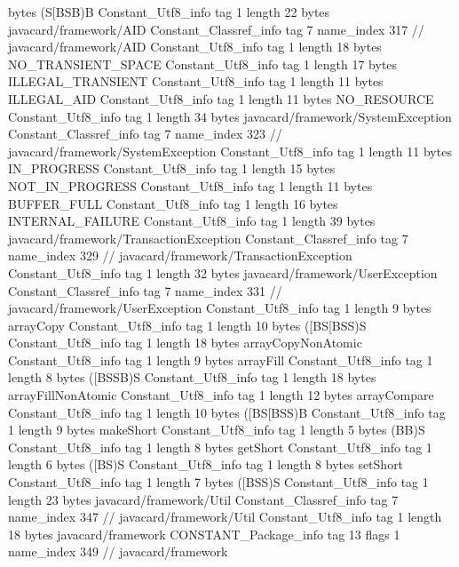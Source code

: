 {{{			bytes	(S[BSB)B
		}
		Constant_Utf8_info {
			tag	1
			length	22
			bytes	javacard/framework/AID
		}
		Constant_Classref_info {
			tag	7
			name_index	317		// javacard/framework/AID
		}
		Constant_Utf8_info {
			tag	1
			length	18
			bytes	NO_TRANSIENT_SPACE
		}
		Constant_Utf8_info {
			tag	1
			length	17
			bytes	ILLEGAL_TRANSIENT
		}
		Constant_Utf8_info {
			tag	1
			length	11
			bytes	ILLEGAL_AID
		}
		Constant_Utf8_info {
			tag	1
			length	11
			bytes	NO_RESOURCE
		}
		Constant_Utf8_info {
			tag	1
			length	34
			bytes	javacard/framework/SystemException
		}
		Constant_Classref_info {
			tag	7
			name_index	323		// javacard/framework/SystemException
		}
		Constant_Utf8_info {
			tag	1
			length	11
			bytes	IN_PROGRESS
		}
		Constant_Utf8_info {
			tag	1
			length	15
			bytes	NOT_IN_PROGRESS
		}
		Constant_Utf8_info {
			tag	1
			length	11
			bytes	BUFFER_FULL
		}
		Constant_Utf8_info {
			tag	1
			length	16
			bytes	INTERNAL_FAILURE
		}
		Constant_Utf8_info {
			tag	1
			length	39
			bytes	javacard/framework/TransactionException
		}
		Constant_Classref_info {
			tag	7
			name_index	329		// javacard/framework/TransactionException
		}
		Constant_Utf8_info {
			tag	1
			length	32
			bytes	javacard/framework/UserException
		}
		Constant_Classref_info {
			tag	7
			name_index	331		// javacard/framework/UserException
		}
		Constant_Utf8_info {
			tag	1
			length	9
			bytes	arrayCopy
		}
		Constant_Utf8_info {
			tag	1
			length	10
			bytes	([BS[BSS)S
		}
		Constant_Utf8_info {
			tag	1
			length	18
			bytes	arrayCopyNonAtomic
		}
		Constant_Utf8_info {
			tag	1
			length	9
			bytes	arrayFill
		}
		Constant_Utf8_info {
			tag	1
			length	8
			bytes	([BSSB)S
		}
		Constant_Utf8_info {
			tag	1
			length	18
			bytes	arrayFillNonAtomic
		}
		Constant_Utf8_info {
			tag	1
			length	12
			bytes	arrayCompare
		}
		Constant_Utf8_info {
			tag	1
			length	10
			bytes	([BS[BSS)B
		}
		Constant_Utf8_info {
			tag	1
			length	9
			bytes	makeShort
		}
		Constant_Utf8_info {
			tag	1
			length	5
			bytes	(BB)S
		}
		Constant_Utf8_info {
			tag	1
			length	8
			bytes	getShort
		}
		Constant_Utf8_info {
			tag	1
			length	6
			bytes	([BS)S
		}
		Constant_Utf8_info {
			tag	1
			length	8
			bytes	setShort
		}
		Constant_Utf8_info {
			tag	1
			length	7
			bytes	([BSS)S
		}
		Constant_Utf8_info {
			tag	1
			length	23
			bytes	javacard/framework/Util
		}
		Constant_Classref_info {
			tag	7
			name_index	347		// javacard/framework/Util
		}
		Constant_Utf8_info {
			tag	1
			length	18
			bytes	javacard/framework
		}
		CONSTANT_Package_info {
			tag	13
			flags	1
			name_index	349		// javacard/framework
}}}
